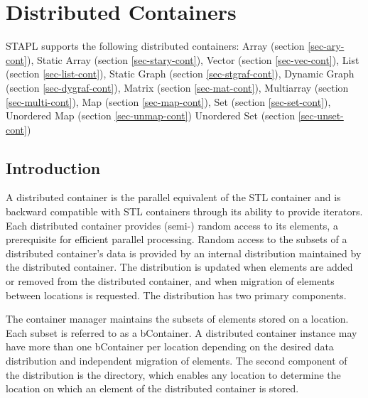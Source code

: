 \chapter{Distributed Containers}

STAPL supports the following distributed containers:
\vspace{0.4cm}
\newline
Array (section \ref{sec-ary-cont}),
Static Array (section \ref{sec-stary-cont}),
\newline
Vector (section \ref{sec-vec-cont}),
List (section \ref{sec-list-cont}),
\newline
Static Graph (section \ref{sec-stgraf-cont}),
Dynamic Graph (section \ref{sec-dygraf-cont}),
\newline
Matrix (section \ref{sec-mat-cont}),
Multiarray (section \ref{sec-multi-cont}),
\newline
Map (section \ref{sec-map-cont}),
Set (section \ref{sec-set-cont}),
\newline
Unordered Map (section \ref{sec-unmap-cont})
Unordered Set (section \ref{sec-unset-cont})
\vspace{0.4cm}


\section{Introduction} \label{sec-cont-intro}

A distributed container is the parallel equivalent of the STL container and is
backward compatible with STL containers through its ability to provide iterators. Each distributed container provides (semi-) random access to its elements, a prerequisite for efficient parallel processing. Random access to the subsets of a distributed container's data is provided by an internal distribution maintained by the distributed container. The distribution is updated when elements are added or removed from the distributed container, and when migration of elements between locations is requested. The distribution has two primary components.

The container manager maintains the subsets of elements stored on a location. Each subset is referred to as a bContainer. A distributed container instance may have more than one bContainer per location depending on the desired data distribution and independent migration of elements. The second component of the distribution is the directory, which enables any location to determine the location on which an element of the distributed container is stored.

